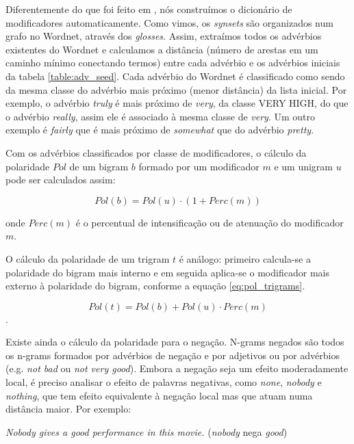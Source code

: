 Diferentemente do que foi feito em , nós construímos o dicionário de modificadores automaticamente. Como vimos, os \textit{synsets} são organizados num grafo no Wordnet, através dos \textit{glosses}. Assim, extraímos todos os advérbios existentes do Wordnet e calculamos a distância (número de arestas em um caminho mínimo conectando termos) entre cada advérbio e os advérbios iniciais da tabela \ref{table:adv_seed}. Cada advérbio do Wordnet é classificado como sendo da mesma classe do advérbio mais próximo (menor distância) da lista inicial. Por exemplo, o advérbio \textit{truly} é mais próximo de \textit{very}, da classe VERY HIGH, do que o advérbio \textit{really}, assim ele é associado à mesma classe de \textit{very}. Um outro exemplo é \textit{fairly} que é mais próximo de \textit{somewhat} que do advérbio \textit{pretty}. 

Com os advérbios classificados por classe de modificadores, o cálculo da polaridade $Pol$ de um bigram $b$ formado por um modificador $m$ e um unigram $u$ pode ser calculados assim: 

\begin{equation}
Pol(b) = Pol(u) \cdot (1 + Perc(m))
\label{eq:pol_bigrams}
\end{equation}

onde $Perc(m)$ é o percentual de intensificação ou de atenuação do modificador $m$. 

O cálculo da polaridade de um trigram $t$ é análogo: primeiro calcula-se a polaridade do bigram mais interno e em seguida aplica-se o modificador mais externo à polaridade do bigram, conforme a equação \ref{eq:pol_trigrams}.

\begin{equation} 
Pol(t) = Pol(b) + Pol(u) \cdot Perc(m)
\label{eq:pol_trigrams}
\end{equation}.

Existe ainda o cálculo da polaridade para o negação. N-grams negados são todos os n-grams formados por advérbios de negação e por adjetivos ou por advérbios (e.g. \textit{not bad} ou \textit{not very good}). Embora a negação seja um efeito moderadamente local, é preciso analisar o efeito de palavras negativas, como \textit{none}, \textit{nobody} e \textit{nothing}, que tem efeito equivalente à negação local \cite{taboada2011lexicon} mas que atuam numa distância maior. Por exemplo:

\begin{example}
\textit{Nobody gives a good performance in this movie.} (\textit{nobody} nega \textit{good})
\label{ex:far_neg_1}
\end{example}

